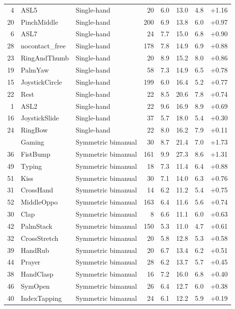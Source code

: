 \begin{table}[h]
\begin{tabular}{rllrrrrr}
4 & ASL5 & Single-hand & 20 & 6.0 & 13.0 & 4.8 & +1.16 \\
20 & PinchMiddle & Single-hand & 200 & 6.9 & 13.8 & 6.0 & +0.97 \\
6 & ASL7 & Single-hand & 24 & 7.7 & 15.0 & 6.8 & +0.90 \\
28 & nocontact\_free & Single-hand & 178 & 7.8 & 14.9 & 6.9 & +0.88 \\
23 & RingAndThumb & Single-hand & 20 & 8.9 & 15.2 & 8.0 & +0.86 \\
19 & PalmYaw & Single-hand & 58 & 7.3 & 14.9 & 6.5 & +0.78 \\
15 & JoystickCircle & Single-hand & 199 & 6.0 & 16.4 & 5.2 & +0.77 \\
22 & Rest & Single-hand & 22 & 8.5 & 20.6 & 7.8 & +0.74 \\
1 & ASL2 & Single-hand & 22 & 9.6 & 16.9 & 8.9 & +0.69 \\
16 & JoystickSlide & Single-hand & 37 & 5.7 & 18.0 & 5.4 & +0.30 \\
24 & RingBow & Single-hand & 22 & 8.0 & 16.2 & 7.9 & +0.11 \\
\addlinespace[3pt]
37 & Gaming & Symmetric bimanual & 30 & 8.7 & 21.4 & 7.0 & +1.73 \\
36 & FistBump & Symmetric bimanual & 161 & 9.9 & 27.3 & 8.6 & +1.31 \\
49 & Typing & Symmetric bimanual & 18 & 7.3 & 11.4 & 6.4 & +0.88 \\
51 & Kiss & Symmetric bimanual & 30 & 7.1 & 14.0 & 6.3 & +0.76 \\
31 & CrossHand & Symmetric bimanual & 14 & 6.2 & 11.2 & 5.4 & +0.75 \\
52 & MiddleOppo & Symmetric bimanual & 163 & 6.4 & 11.6 & 5.6 & +0.74 \\
30 & Clap & Symmetric bimanual & 8 & 6.6 & 11.1 & 6.0 & +0.63 \\
42 & PalmStack & Symmetric bimanual & 150 & 5.3 & 11.0 & 4.7 & +0.61 \\
32 & CrossStretch & Symmetric bimanual & 20 & 5.8 & 12.8 & 5.3 & +0.58 \\
39 & HandRub & Symmetric bimanual & 20 & 6.7 & 13.4 & 6.2 & +0.51 \\
44 & Prayer & Symmetric bimanual & 28 & 6.2 & 13.7 & 5.7 & +0.45 \\
38 & HandClasp & Symmetric bimanual & 16 & 7.2 & 16.0 & 6.8 & +0.40 \\
46 & SymOpen & Symmetric bimanual & 26 & 6.4 & 12.7 & 6.0 & +0.38 \\
40 & IndexTapping & Symmetric bimanual & 24 & 6.1 & 12.2 & 5.9 & +0.19 \\

\end{tabular}
\end{table}
